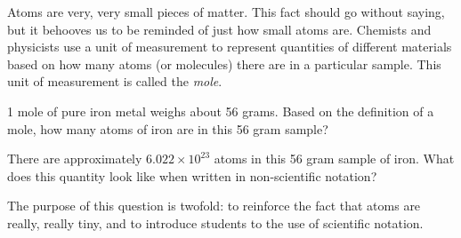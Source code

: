 

Atoms are very, very small pieces of matter.  This fact should go without saying, but it behooves us to be reminded of just how small atoms are.  Chemists and physicists use a unit of measurement to represent quantities of different materials based on how many atoms (or molecules) there are in a particular sample.  This unit of measurement is called the {\it mole}.

1 mole of pure iron metal weighs about 56 grams.  Based on the definition of a mole, how many atoms of iron are in this 56 gram sample?







There are approximately $6.022 \times 10^{23}$ atoms in this 56 gram sample of iron.  What does this quantity look like when written in non-scientific notation?







The purpose of this question is twofold: to reinforce the fact that atoms are really, really tiny, and to introduce students to the use of scientific notation.




